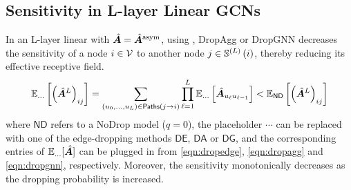 \subsection{Sensitivity in L-layer Linear GCNs}
\label{sec:proofs-thm}

\begin{theorem*}
    In an L-layer linear  with $\hat{\bm{A}} = \hat{\bm{A}}^{\text{asym}}$, using , DropAgg or DropGNN decreases the sensitivity of a node $i\in\mathcal{V}$ to another node $j\in \mathbb{S}^{\left(L\right)}\left(i\right)$, thereby reducing its effective receptive field. 
    \begin{align}
        \mathbb{E}_{\ldots} \left[\left(\hat{\bm{A}}^L\right)_{ij}\right] = \sum_{\left(u_0,\ldots,u_L\right)\in\mathsf{Paths}\left(j\to i\right)} \prod_{\ell=1}^L \mathbb{E}_{\ldots} \left[\hat{\bm{A}}_{u_{\ell}u_{\ell-1}}\right] < \mathbb{E}_{\mathsf{ND}} \left[\left(\hat{\bm{A}}^L\right)_{ij}\right]
    \end{align}
    where $\mathsf{ND}$ refers to a NoDrop model ($q=0$), the placeholder $\cdots$ can be replaced with one of the edge-dropping methods $\mathsf{DE}$, $\mathsf{DA}$ or $\mathsf{DG}$, and the corresponding entries of $\mathbb{E}_{\ldots} [\hat{\bm{A}}]$ can be plugged in from \autoref{eqn:dropedge}, \autoref{eqn:dropagg} and \autoref{eqn:dropgnn}, respectively. Moreover, the sensitivity monotonically decreases as the dropping probability is increased.
\end{theorem*}

